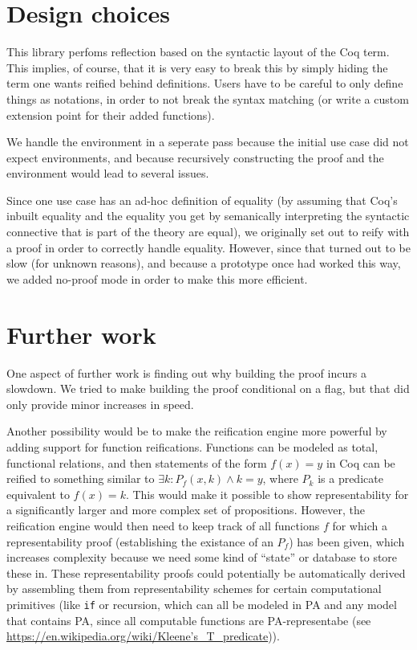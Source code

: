 \documentclass[11pt,a4paper]{article}
\newcommand{\link}[1]{\href{#1}{#1}}
\begin{document}
\section{Design choices}
This library perfoms reflection based on the syntactic layout of the Coq term. This implies, of course, that it is very easy to break this by simply hiding the term one wants reified behind definitions. Users have to be careful to only define things as notations, in order to not break the syntax matching (or write a custom extension point for their added functions).

We handle the environment in a seperate pass because the initial use case did not expect environments, and because recursively constructing the proof and the environment would lead to several issues.

Since one use case has an ad-hoc definition of equality (by assuming that Coq's inbuilt equality and the equality you get by semanically interpreting the syntactic connective that is part of the theory are equal), we originally set out to reify with a proof in order to correctly handle equality. However, since that turned out to be slow (for unknown reasons), and because a prototype once had worked this way, we added no-proof mode in order to make this more efficient.
\section{Further work}
One aspect of further work is finding out why building the proof incurs a slowdown. We tried to make building the proof conditional on a flag, but that did only provide minor increases in speed.

Another possibility would be to make the reification engine more powerful by adding support for function reifications. Functions can be modeled as total, functional relations, and then statements of the form $f(x)=y$ in Coq can be reified to something similar to $\exists k : P_f(x,k) \wedge k=y$, where $P_k$ is a predicate equivalent to $f(x)=k$. This would make it possible to show representability for a significantly larger and more complex set of propositions. However, the reification engine would then need to keep track of all functions $f$ for which a representability proof (establishing the existance of an $P_f$) has been given, which increases complexity because we need some kind of \enquote{state} or database to store these in. These representability proofs could potentially be automatically derived by assembling them from representability schemes for certain computational primitives (like \lstinline|if| or recursion, which can all be modeled in PA and any model that contains PA, since all computable functions are PA-representabe (see \link{https://en.wikipedia.org/wiki/Kleene's\_T\_predicate})).
\end{document}
